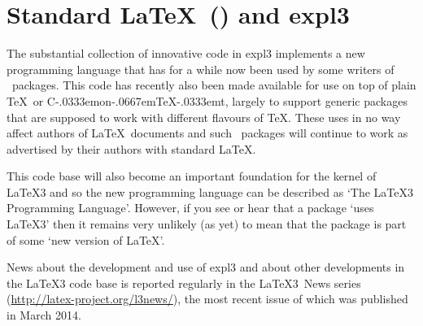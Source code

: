 \documentclass{ltnews}
\def\ConTeXt{C\kern-.0333emon\-\kern-.0667em\TeX\kern-.0333emt}
\begin{document}
\vfill

\section{Standard \LaTeX\ (\LaTeXe) and \textsf{expl3}}

The substantial collection of innovative code in \textsf{expl3}
implements a new programming language that has for a while now been
used by some writers of \LaTeXe\ packages.  This code has recently
also been made available for use on top of plain \TeX\ or {\ConTeXt},
largely to support generic packages that are supposed to work with
different flavours of \TeX.  These uses in no way affect authors of
\LaTeX\ documents and such \LaTeXe\ packages will continue to work as
advertised by their authors with standard \LaTeX.

This code base will also become an important foundation for the kernel
of \LaTeX3 and so the new programming language can be described as
`The \LaTeX3 Programming Language'. However, if you see or hear that a
package `uses \LaTeX3' then it remains very unlikely (as yet) to mean
that the package is part of some `new version of \LaTeX'.

News about the development and use of \textsf{expl3} and about other
developments in the \LaTeX3 code base is reported regularly in the
\LaTeX3~News series (\url{http://latex-project.org/l3news/}), the most
recent issue of which was published in March 2014.
\end{document}
